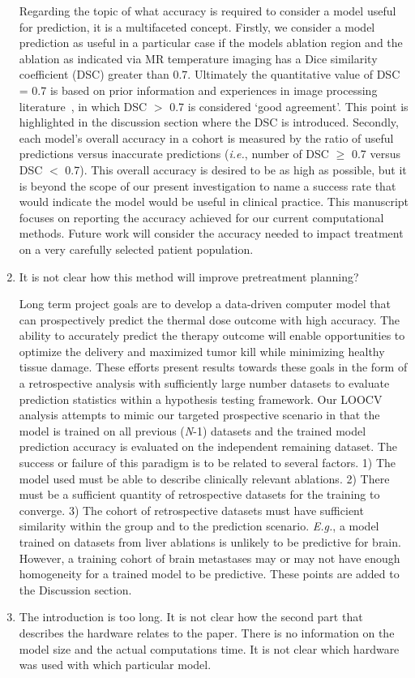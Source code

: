 \documentclass[letterpaper,12pt]{report}
\begin{document}
\begin{enumerate}
{Regarding the topic of what accuracy is required to consider a model useful
for prediction, it is a multifaceted concept. Firstly, we consider a model
prediction as useful in a particular case if the models ablation region and
the ablation as indicated via MR temperature imaging has a Dice similarity
coefficient (DSC) greater than 0.7. Ultimately the quantitative value of
DSC = 0.7 is based on prior information and experiences in image processing
literature~\cite{yung2010quantitative,Dice1945measures,zou2004three},  
in which DSC $>$ 0.7 is considered `good agreement'. This point is highlighted
in the discussion section where the DSC is introduced.
Secondly, each model's overall accuracy in
a cohort is measured by the ratio of useful predictions versus inaccurate
predictions (\textit{i.e.}, number of DSC $\geq$ 0.7 versus DSC $<$ 0.7).
This overall accuracy is desired to be as high as possible, but it is beyond the
scope of our present investigation to name a success rate that would
indicate the model would be useful in clinical practice. This manuscript
focuses on reporting the accuracy achieved for our current computational
methods. Future work will consider the accuracy needed to impact treatment 
on a very carefully selected patient population.

}
\item
It is not clear how this method will improve pretreatment planning?

{\color{red}
Long term project goals are to develop a data-driven computer model
that can prospectively predict the thermal dose outcome with high
accuracy. The ability to accurately predict the therapy outcome will enable
opportunities to optimize the delivery and maximized tumor kill while
minimizing healthy tissue damage. These efforts present results towards these goals
in the form of a retrospective analysis
with sufficiently large number datasets to evaluate prediction
statistics within a hypothesis testing framework. 
Our LOOCV analysis attempts to mimic our targeted prospective scenario
in that the model is trained on all previous (\textit{N}-1) datasets and
the trained model prediction accuracy is evaluated on the
independent remaining dataset.
The success or failure of this paradigm is
to be related to several factors. 1) The model used must be able to
describe clinically relevant ablations. 2) There must be a sufficient
quantity of retrospective datasets for the
training to converge. 3) The cohort of retrospective datasets must have sufficient similarity within the
group and to the prediction scenario. \textit{E.g.}, a model trained on datasets from liver ablations is unlikely to
be predictive for brain. However, a training cohort of brain
metastases may or may not have enough homogeneity for a trained model
to be predictive. These points are added to the Discussion section.
}
\item
The introduction is too long. It is not clear how the second part that
describes the hardware relates to the paper.  There is no information
on the model size and the actual computations time.
It is not clear which hardware was used with which particular model. 


\end{enumerate}
\end{document}
